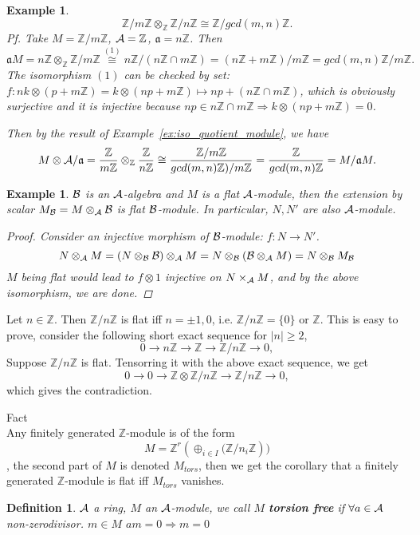 \documentclass[11pt]{article}
\newtheorem{dfn}[thm]{Definition}
\newtheorem{ex}[thm]{Example}
\newcommand{\intg}{\mathbb Z}
\newcommand{\sca}{{\mathfrak a}}
\newcommand{\cala}{{\cal A}}
\newcommand{\calb}{{\cal B}}
\newcommand{\Lrta}{\Longrightarrow}
\newcommand{\lrta}{\longrightarrow}
\begin{document}
\begin{ex}
$$\intg/m\intg\otimes_\intg \intg/n\intg\cong \intg/gcd(m,n)\intg.$$ 
Pf. Take $M=\intg/m\intg$, $\cala=\intg$, $\sca=n\intg$. Then $$
\sca M=n\intg\otimes_\intg\intg/m\intg\overset{(1)}{\cong}n\intg/(n\intg\cap m\intg)=(n\intg+m\intg)/m\intg=gcd(m,n)\intg/m\intg.
$$
The isomorphism $(1)$ can be checked by set: $f: nk\otimes (p+m\intg)=k\otimes (np+m\intg)\longmapsto np+(n\intg\cap m\intg)$, which is obviously surjective and it is injective because $np\in n\intg\cap m\intg\Lrta k\otimes (np+m\intg)=0$.

Then by the result of Example~\ref{ex:iso_quotient_module}, we have
$$
M\otimes \cala/\sca=\frac{\intg}{m\intg}\otimes_\intg \frac{\intg}{n\intg}\cong\frac{\intg/m\intg}{gcd(m,n)\intg)/m\intg}= \frac{\intg}{gcd(m,n)\intg}=M/\sca M.
$$
\end{ex}

\begin{ex}
$\calb$ is an $\cala$-algebra and $M$ is a flat $\cala$-module, then the extension by scalar $M_\calb=M\otimes_\cala\calb$ is flat $\calb$-module. In particular, $N, N'$ are also $\cala$-module.
\begin{proof}
Consider an injective morphism of $\calb$-module: $f: N\lrta N'$.
$$
N\otimes_\cala M=(N\otimes_\calb \calb)\otimes_\cala M=N\otimes_\calb(\calb\otimes_\cala M)=N\otimes_\calb M_\calb
$$
$M$ being flat would lead to $f\otimes 1$ injective on $N\times_\cala M$, and by the above isomorphism, we are done.
\end{proof}
\end{ex}
Let $n\in\intg$. Then $\intg/n\intg$ is flat iff $n=\pm1,0$, i.e. $\intg/n\intg=\{0\} \text{ or } \intg$. This is easy to prove, consider the following short exact sequence for $|n|\geq 2$,
$$
0\lrta n\intg\lrta \intg\lrta \intg/n\intg\lrta 0,
$$
Suppose $\intg/n\intg$ is flat. Tensorring it with the above exact sequence, we get
$$
0\lrta0\lrta \intg\otimes\intg/n\intg\lrta \intg/n\intg\lrta 0,
$$
which gives the contradiction. 

Fact\\
Any finitely generated $\intg$-module is of the form
$$
M=\intg^r\left(\oplus_{i\in I}(\intg/n_i\intg\right))
$$,
 the second part of $M$ is denoted $M_{tors}$, then we get the corollary that a finitely generated $\intg$-module is flat iff $M_{tors}$ vanishes.
\begin{dfn}
$\cala$ a ring, $M$ an $\cala$-module, we call $M$ \textbf{torsion free} if $\forall a\in \cala$ non-zerodivisor. $m\in M$ $am=0\Lrta m=0$
\end{dfn}
\end{document}
